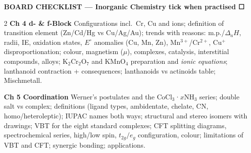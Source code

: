 \documentclass[9pt,a4paper]{extarticle}
\begin{document}
\begin{tcolorbox}[enhanced,colback=navy,colframe=navy,arc=2pt,left=6pt,right=6pt,top=2pt,bottom=2pt,before skip=4pt]
\color{white}\sffamily\bfseries\small BOARD CHECKLIST — Inorganic Chemistry \hfill\footnotesize\mdseries tick when practised ☐
\end{tcolorbox}
\begin{multicols}{2}\raggedcolumns
\scriptsize
\textbf{\textcolor{uIV}{Ch 4 d- \& f-Block}} Configurations incl.\ Cr, Cu and ions; definition of transition element (Zn/Cd/Hg vs Cu/Ag/Au); trends with reasons: m.p./$\Delta_aH$, radii, IE, oxidation states, $E^\circ$ anomalies (Cu, Mn, Zn), Mn$^{3+}$/Cr$^{2+}$, Cu$^+$ disproportionation; colour, magnetism ($\mu$), complexes, catalysis, interstitial compounds, alloys; K$_2$Cr$_2$O$_7$ and KMnO$_4$ preparation and \emph{ionic equations}; lanthanoid contraction + consequences; lanthanoids vs actinoids table; Mischmetall.

\textbf{\textcolor{uV}{Ch 5 Coordination}} Werner's postulates and the CoCl$_3$·$x$NH$_3$ series; double salt vs complex; definitions (ligand types, ambidentate, chelate, CN, homo/heteroleptic); IUPAC names both ways; structural and stereo isomers with drawings; VBT for the eight standard complexes; CFT splitting diagrams, spectrochemical series, high/low spin, $t_{2g}/e_g$ configuration, colour; limitations of VBT and CFT; synergic bonding; applications.
\end{multicols}

\begin{tcolorbox}[enhanced,colback=white,colframe=navy,boxrule=0.8pt,arc=2pt,title={\sffamily\bfseries\footnotesize My notes},colbacktitle=navy,coltitle=white,height fill,before skip=4pt]
\end{tcolorbox}
\end{document}
